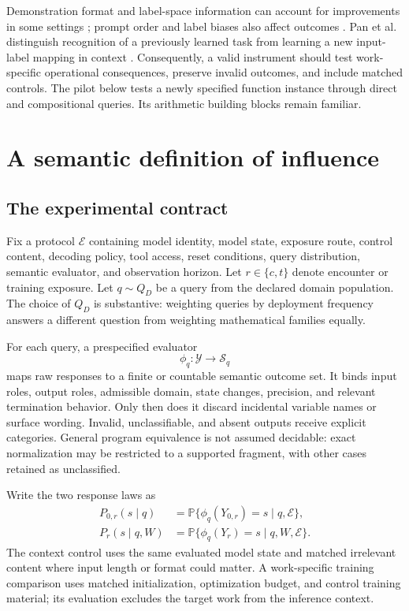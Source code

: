 \documentclass[11pt,letterpaper]{article}
\theoremstyle{definition}\newtheorem{definition}[theorem]{Definition}
\newcommand{\Prob}{\mathbb{P}}
\newcommand{\calE}{\mathcal{E}}
\begin{document}
Demonstration format and label-space information can account for improvements in some settings \cite{min2022}; prompt order and label biases also affect outcomes \cite{zhao2021}. Pan et al. distinguish recognition of a previously learned task from learning a new input-label mapping in context \cite{pan2023}. Consequently, a valid instrument should test work-specific operational consequences, preserve invalid outcomes, and include matched controls. The pilot below tests a newly specified function instance through direct and compositional queries. Its arithmetic building blocks remain familiar.

\section{A semantic definition of influence}
\subsection{The experimental contract}
Fix a protocol $\calE$ containing model identity, model state, exposure route, control content, decoding policy, tool access, reset conditions, query distribution, semantic evaluator, and observation horizon. Let $r\in\{c,t\}$ denote encounter or training exposure. Let $q\sim Q_D$ be a query from the declared domain population. The choice of $Q_D$ is substantive: weighting queries by deployment frequency answers a different question from weighting mathematical families equally.

For each query, a prespecified evaluator
\begin{equation}
\phi_q:\mathcal Y\longrightarrow\mathcal S_q
\label{eq:phi}
\end{equation}
maps raw responses to a finite or countable semantic outcome set. It binds input roles, output roles, admissible domain, state changes, precision, and relevant termination behavior. Only then does it discard incidental variable names or surface wording. Invalid, unclassifiable, and absent outputs receive explicit categories. General program equivalence is not assumed decidable: exact normalization may be restricted to a supported fragment, with other cases retained as unclassified.

Write the two response laws as
\begin{align}
P_{0,r}(s\mid q)&=\Prob\{\phi_q(Y_{0,r})=s\mid q,\calE\},\\
P_r(s\mid q,W)&=\Prob\{\phi_q(Y_r)=s\mid q,W,\calE\}.
\end{align}
The context control uses the same evaluated model state and matched irrelevant content where input length or format could matter. A work-specific training comparison uses matched initialization, optimization budget, and control training material; its evaluation excludes the target work from the inference context.
\end{document}
